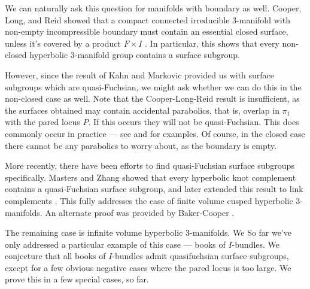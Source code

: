 We can naturally ask this question for manifolds with boundary as well.
Cooper, Long, and Reid showed that a compact connected irreducible 3-manifold
with non-empty incompressible boundary  must contain an essential closed
surface, unless it's covered by a product $F\times I$ \cite{CLR}. In
particular, this shows that every non-closed hyperbolic 3-manifold group
contains a surface subgroup.

However, since the result of Kahn and Markovic provided us with surface
subgroups which are quasi-Fuchsian, we might ask whether we can do this in the
non-closed case as well. Note that the Cooper-Long-Reid result is insufficient,
as the surfaces obtained may contain accidental parabolics, that is, overlap in
$\pi_1$ with the pared locus $P$. If this occurs they will not be
quasi-Fuchsian. This does commonly occur in practice --- see \cite{CLRbundles}
and \cite{MenascoReid} for examples. Of course, in the closed case there cannot
be any parabolics to worry about, as the boundary is empty.


More recently, there have been efforts to find quasi-Fuchsian surface subgroups
specifically. Masters and Zhang \cite{MZ} showed that every hyperbolic knot
complement contains a quasi-Fuchsian surface subgroup, and later extended this
result to link complements \cite{MZ2}. This fully addresses the case of finite
volume cusped hyperbolic 3-manifolds. An alternate proof was provided by
Baker-Cooper \cite{BC}.

The remaining case is infinite volume hyperbolic 3-manifolds. We So far we've only
addressed a particular example of this case --- books of $I$-bundles. We
conjecture that all books of $I$-bundles admit quasifuchsian surface subgroups,
except for a few obvious negative cases where the pared locus is too large. We
prove this in a few special cases, so far.

